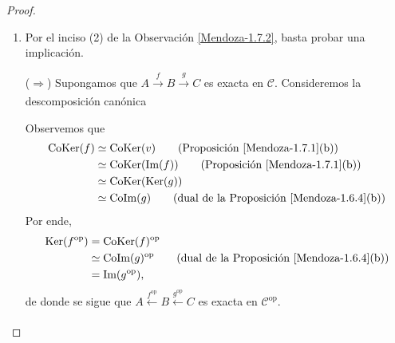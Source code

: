 \documentclass[tesis]{subfiles}
\begin{document}
\begin{proof}\leavevmode

    \begin{enumerate}[label=(\alph*)]
    
        \item Por el inciso (2) de la Observación \ref{Mendoza-1.7.2}, basta probar una implicación.

            ($\Rightarrow$) Supongamos que $A\xrightarrow[]{f} B\xrightarrow[]{g} C$ es exacta en $\mathscr{C}$. Consideremos la descomposición canónica
            \begin{center}
            \end{center}
            Observemos que
            \begin{align*}
                \text{CoKer}(f) &\simeq \text{CoKer}(v) \tag{Proposición \ref{Mendoza-1.7.1}(b)} \\
                                &\simeq \text{CoKer}(\text{Im}(f)) \tag{Proposición \ref{Mendoza-1.7.1}(b)} \\
                                &\simeq \text{CoKer}(\text{Ker}(g)) \\
                                &\simeq \text{CoIm}(g) \tag{dual de la Proposición \ref{Mendoza-1.6.4}(b)}
            \end{align*}
            Por ende,
            \begin{align*}
                \text{Ker}(f^\text{op}) &= \text{CoKer}(f)^\text{op} \\
                                        &\simeq \text{CoIm}(g)^\text{op} \tag{dual de la Proposición \ref{Mendoza-1.6.4}(b)} \\
                                        &= \text{Im}(g^\text{op}),
            \end{align*}
            de donde se sigue que $A\xleftarrow[]{f^\text{op}} B\xleftarrow[]{g^\text{op}} C$ es exacta en $\mathscr{C}^\text{op}$.


\end{enumerate}
\end{proof}
\end{document}
